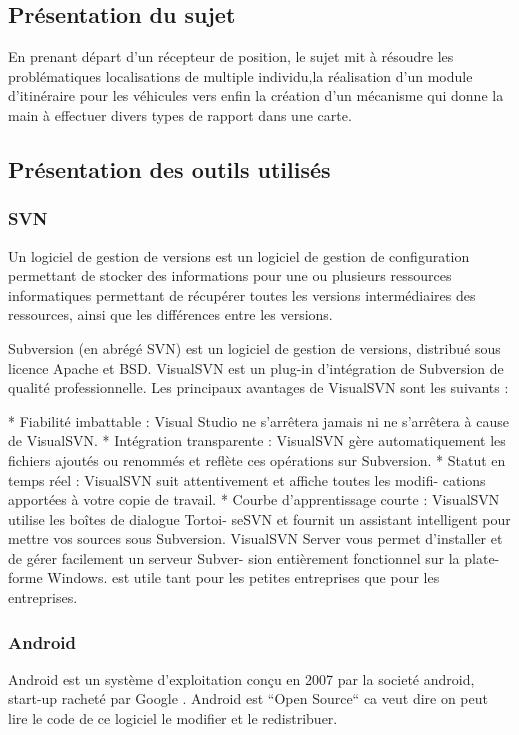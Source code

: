 \subsection{Présentation du sujet}
En prenant départ d'un récepteur de position, le sujet mit à résoudre les 
problématiques localisations de multiple individu,la réalisation 
d'un module d'itinéraire pour les véhicules vers enfin la création
d'un mécanisme qui donne la main à effectuer divers types de rapport
dans une carte.
\subsection{Présentation des outils utilisés}
\subsubsection{SVN}
Un logiciel de gestion de versions est un logiciel de gestion
de configuration permettant
de stocker des informations pour une ou plusieurs ressources
informatiques permettant de
récupérer toutes les versions intermédiaires des ressources,
ainsi que les différences entre
les versions.


Subversion (en abrégé SVN) est un logiciel de gestion de versions, distribué sous licence
Apache et BSD.
VisualSVN est un plug-in d’intégration de Subversion de qualité professionnelle. Les
principaux avantages de VisualSVN sont les suivants :

* Fiabilité imbattable : Visual Studio ne s’arrêtera jamais ni ne s’arrêtera à cause
de VisualSVN.
* Intégration transparente : VisualSVN gère automatiquement les fichiers ajoutés
ou renommés et reflète ces opérations sur Subversion.
* Statut en temps réel : VisualSVN suit attentivement et affiche toutes les modifi-
cations apportées à votre copie de travail.
* Courbe d’apprentissage courte : VisualSVN utilise les boîtes de dialogue Tortoi-
seSVN et fournit un assistant intelligent pour mettre vos sources sous Subversion.
VisualSVN Server vous permet d’installer et de gérer facilement un serveur Subver-
sion entièrement fonctionnel sur la plate-forme Windows. est utile tant pour les petites
entreprises que pour les entreprises.
\subsubsection{Android}
Android est un système d'exploitation conçu en 2007 par la societé android,
start-up racheté par Google . Android est ``Open Source`` ca veut dire on peut
lire le code de ce logiciel le modifier et le redistribuer.

